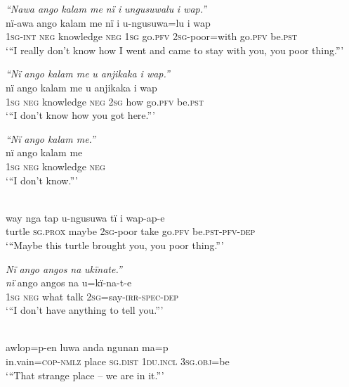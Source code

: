\ex \negmedspace \textit{“N}{\textit{awa ango}} \textit{kalam m}{\textit{e nï i}} \textit{ungusuwal}{\textit{u}} \textit{i wap.”}\\
\gll nï-awa    ango kalam    {me} nï    i    u-ngusuwa{=}lu  i wap\\
1\textsc{sg-int}  \textsc{neg}  knowledge  \textsc{neg}  1\textsc{sg}  go.\textsc{pfv}  \textsc{2sg-}poor=with go.\textsc{pfv}  be.\textsc{pst}\\
\glt ‘“I really don’t know how I went and came to stay with you, you poor thing.”’

\ex \negmedspace \textit{“N}{\textit{ï}} \textit{ango kalam m}{\textit{e}} \textit{u anjikaka i wap.”}\\
\gll nï ango  kalam      me    u anjikaka  i wap\\
1\textsc{sg}  \textsc{neg}  knowledge    \textsc{neg}  2\textsc{sg}  how    go.\textsc{pfv}  be.\textsc{pst}\\
\glt ‘“{I don’t know how you got here.”}’

\ex \negmedspace \textit{“N}{\textit{ï}} \textit{ango kalam me.”}\\
\gll n{ï} ango  kalam      {m}e\\
1\textsc{sg}  \textsc{neg}  knowledge    \textsc{neg}\\
\glt ‘“I don’t know.”’

\ex {}\\
\gll wa{y} nga      tap    u-ngusuwa  t{ï} i wa{p-ap-e}\\
turtle  \textsc{sg.prox}  maybe  2\textsc{sg-}poor  take  go.\textsc{pfv}  be.\textsc{pst}{}-\textsc{pfv}{}-\textsc{dep}\\
\glt ‘“{Maybe this turtle brought you, you poor thing.”}’

\ex {}\textit{N}{\textit{ï}} \textit{ango angos na} {\textit{ukïn}}\textit{ate.”}\\
\gll \textit{n}{\textit{ï}} ango  angos  na    {u=kï-n}a{{}-}t{{}-}e\\
1\textsc{sg}  \textsc{neg}  what  talk  2\textsc{sg}=say-\textsc{irr-spec-dep}\\
\glt ‘“{I don’t have anything to tell you.”}’

\ex {}\\
\gll awlop=p{{}-}e{n} luwa  {a}nda    ngunan  ma=p\\
in.vain=\textsc{cop}{}-\textsc{nmlz}  place  \textsc{sg.dist}  1\textsc{du.incl}  3\textsc{sg.obj}=be\\
\glt ‘“{That strange place -- we are in it.”}’

